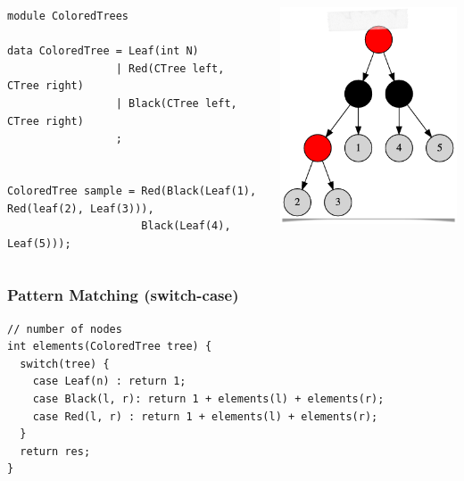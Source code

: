 \documentclass{beamer}
\begin{document}
\begin{frame}[fragile]

  \begin{columns}
  \begin{column}{0.7\textwidth}
  \begin{small}
  \begin{lstlisting}[language=Rascal]
module ColoredTrees

data ColoredTree = Leaf(int N)
                 | Red(CTree left, CTree right)
                 | Black(CTree left, CTree right)
                 ;


ColoredTree sample = Red(Black(Leaf(1), Red(leaf(2), Leaf(3))),
                     Black(Leaf(4), Leaf(5))); 
  \end{lstlisting}
  \end{small}
  \end{column}
  \begin{column}{0.3\textwidth}
    \begin{center}
      \pause \includegraphics[scale=0.25]{images/rb01.png}
  \end{center}    
  \end{column}
  \end{columns}
  
\end{frame}

\begin{frame}[fragile]
  \frametitle{Pattern Matching (switch-case)}

    \begin{small}
      \begin{lstlisting}[language=Rascal]
// number of nodes  
int elements(ColoredTree tree) {
  switch(tree) {
    case Leaf(n) : return 1; 
    case Black(l, r): return 1 + elements(l) + elements(r);
    case Red(l, r) : return 1 + elements(l) + elements(r);
  }
  return res; 
} 
\end{lstlisting}
    \end{small}

  
\end{frame}
\end{document}

